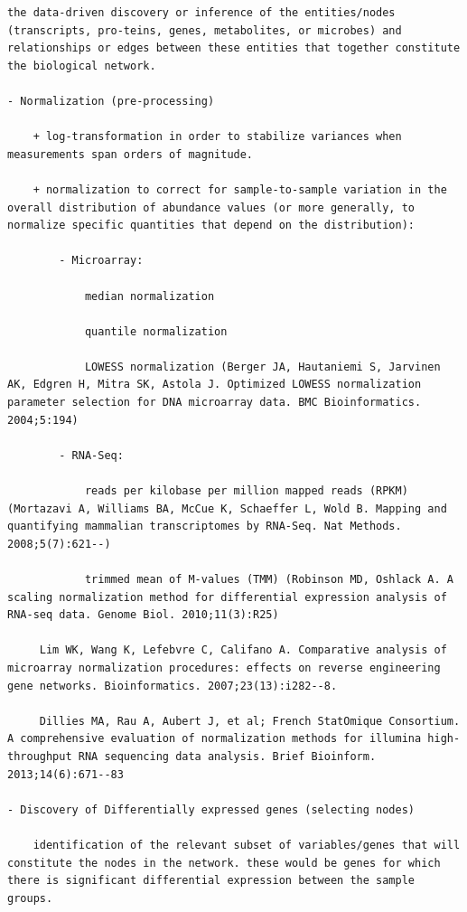\documentclass[
]{book}
\begin{document}
\begin{verbatim}
the data-driven discovery or inference of the entities/nodes (transcripts, pro-teins, genes, metabolites, or microbes) and relationships or edges between these entities that together constitute the biological network.

- Normalization (pre-processing)

    + log-transformation in order to stabilize variances when measurements span orders of magnitude.

    + normalization to correct for sample-to-sample variation in the overall distribution of abundance values (or more generally, to normalize specific quantities that depend on the distribution):

        - Microarray:

            median normalization

            quantile normalization

            LOWESS normalization (Berger JA, Hautaniemi S, Jarvinen AK, Edgren H, Mitra SK, Astola J. Optimized LOWESS normalization parameter selection for DNA microarray data. BMC Bioinformatics. 2004;5:194)

        - RNA-Seq:

            reads per kilobase per million mapped reads (RPKM) (Mortazavi A, Williams BA, McCue K, Schaeffer L, Wold B. Mapping and quantifying mammalian transcriptomes by RNA-Seq. Nat Methods. 2008;5(7):621--)

            trimmed mean of M-values (TMM) (Robinson MD, Oshlack A. A scaling normalization method for differential expression analysis of RNA-seq data. Genome Biol. 2010;11(3):R25)

     Lim WK, Wang K, Lefebvre C, Califano A. Comparative analysis of microarray normalization procedures: effects on reverse engineering gene networks. Bioinformatics. 2007;23(13):i282--8.

     Dillies MA, Rau A, Aubert J, et al; French StatOmique Consortium. A comprehensive evaluation of normalization methods for illumina high-throughput RNA sequencing data analysis. Brief Bioinform. 2013;14(6):671--83

- Discovery of Differentially expressed genes (selecting nodes)

    identification of the relevant subset of variables/genes that will constitute the nodes in the network. these would be genes for which there is significant differential expression between the sample groups.


\end{verbatim}
\end{document}
